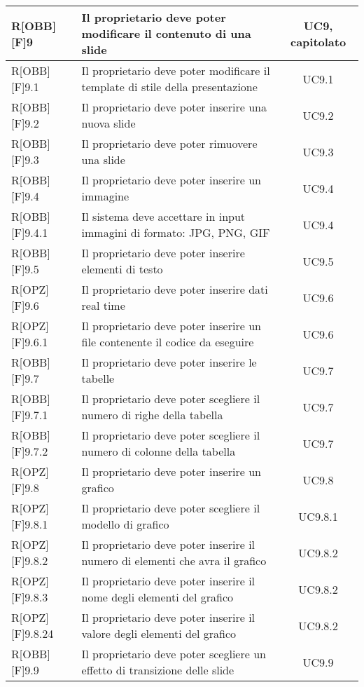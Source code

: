 \begin{longtable}{|l|p{}|c|}
		R[OBB][F]9 & Il proprietario deve poter modificare il contenuto di una slide & UC9, capitolato \\ \midrule
		R[OBB][F]9.1 & Il proprietario deve poter modificare il template di stile della presentazione & UC9.1 \\ \midrule
		R[OBB][F]9.2 & Il proprietario deve poter inserire una nuova slide & UC9.2 \\ \midrule
		R[OBB][F]9.3 & Il proprietario deve poter rimuovere una slide & UC9.3 \\ \midrule
		R[OBB][F]9.4 & Il proprietario deve poter inserire un immagine & UC9.4 \\ \midrule
		R[OBB][F]9.4.1 & Il sistema deve accettare in input immagini di formato: JPG, PNG, GIF & UC9.4 \\ \midrule
		R[OBB][F]9.5 & Il proprietario deve poter inserire elementi di testo & UC9.5 \\ \midrule
		R[OPZ][F]9.6 & Il proprietario deve poter inserire dati real time & UC9.6 \\ \midrule
		R[OPZ][F]9.6.1 & Il proprietario deve poter inserire un file contenente il codice da eseguire  & UC9.6 \\ \midrule
		R[OBB][F]9.7 & Il proprietario deve poter inserire le tabelle & UC9.7 \\ \midrule
		R[OBB][F]9.7.1 & Il proprietario deve poter scegliere il numero di righe della tabella & UC9.7 \\ \midrule
		R[OBB][F]9.7.2 & Il proprietario deve poter scegliere il numero di colonne della tabella & UC9.7 \\ \midrule
		R[OPZ][F]9.8 & Il proprietario deve poter inserire un grafico & UC9.8 \\ \midrule
		R[OPZ][F]9.8.1 & Il proprietario deve poter scegliere il modello di grafico  & UC9.8.1 \\ \midrule
		R[OPZ][F]9.8.2 & Il proprietario deve poter inserire il numero di elementi che avra il grafico & UC9.8.2 \\ \midrule
		R[OPZ][F]9.8.3 & Il proprietario deve poter inserire il nome degli elementi del grafico  & UC9.8.2 \\ \midrule
		R[OPZ][F]9.8.24 & Il proprietario deve poter inserire il valore degli elementi del grafico & UC9.8.2 \\ \midrule
		R[OBB][F]9.9 & Il proprietario deve poter scegliere un effetto di transizione delle slide & UC9.9 \\ \midrule
		

\end{longtable}
